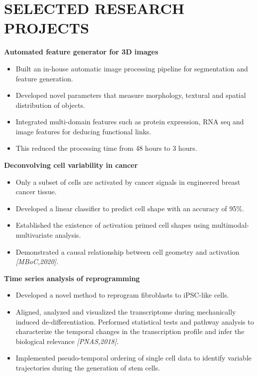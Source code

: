 \documentclass[letterpaper,11pt]{article}
\begin{document}
\section{\bf SELECTED RESEARCH PROJECTS}
{\bf Automated feature generator for 3D images}
\begin{itemize}
    \item Built an in-house automatic image processing pipeline for segmentation and feature generation.
    \item Developed novel parameters that measure morphology, textural and spatial distribution of objects.
     \item Integrated multi-domain features such as protein expression, RNA seq and image features for deducing functional links. 
    \item This reduced the processing time from 48 hours to 3 hours. 
\end{itemize}
\vspace{1mm}
{\bf Deconvolving cell variability in cancer}
\begin{itemize}
    \item Only a subset of cells are activated by cancer signals in engineered breast cancer tissue.
     \item Developed a linear classifier to predict cell shape with an accuracy of 95\%.
     \item Established the existence of activation primed cell shapes using multimodal-multivariate analysis.
    \item Demonstrated a causal relationship between cell geometry and activation \em {[MBoC,2020]}.
\end{itemize}
\vspace{1mm}
{\bf Time series analysis of reprogramming}
\begin{itemize}
    \item Developed a novel method to reprogram fibroblasts to iPSC-like cells.
    \item Aligned, analyzed and visualized the transcriptome during mechanically induced de-differentiation. Performed statistical tests and pathway analysis to characterize the temporal changes in the transcription profile and infer the biological relevance \em {[PNAS,2018]}.
    \item Implemented pseudo-temporal ordering of single cell data to identify variable trajectories during the generation of stem cells. 
\end{itemize}

\vspace{1mm}
\end{document}
